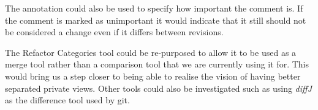 The annotation could also be used to specify how important the comment is. If the comment is marked as unimportant it would indicate that it still should not be considered a change even if it differs between revisions.

The Refactor Categories tool could be re-purposed to allow it to be used as a merge tool rather than a comparison tool that we are currently using it for.  This would bring us a step closer to being able to realise the vision of having better separated private views.  Other tools could also be investigated such as using \emph{diffJ} as the difference tool used by git.
% 
% 
% 
% 
% 
